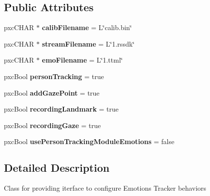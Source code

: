 \subsection*{Public Attributes}
\begin{DoxyCompactItemize}
\item 
\mbox{\label{class_emotions_configuration_abd2c50caf6290933d5044e49b218f207}} 
pxc\+C\+H\+AR $\ast$ {\bfseries calib\+Filename} = L\char`\"{}calib.\+bin\char`\"{}
\item 
\mbox{\label{class_emotions_configuration_a2cdaff812ec953152f9648448859f44e}} 
pxc\+C\+H\+AR $\ast$ {\bfseries stream\+Filename} = L\char`\"{}1.rssdk\char`\"{}
\item 
\mbox{\label{class_emotions_configuration_a0acd66cdfc61dde2654762c5b43f9c89}} 
pxc\+C\+H\+AR $\ast$ {\bfseries emo\+Filename} = L\char`\"{}1.ttml\char`\"{}
\item 
\mbox{\label{class_emotions_configuration_ab1df9d7d072e50194dc3d85b38c6d6cb}} 
pxc\+Bool {\bfseries person\+Tracking} = true
\item 
\mbox{\label{class_emotions_configuration_a5e1ccf5105dd5bfed0fc021c4c8a32d4}} 
pxc\+Bool {\bfseries add\+Gaze\+Point} = true
\item 
\mbox{\label{class_emotions_configuration_a88d1643658f047c84d85f1a786762a3f}} 
pxc\+Bool {\bfseries recording\+Landmark} = true
\item 
\mbox{\label{class_emotions_configuration_a127e56275ce6a1326e85a35ac981a211}} 
pxc\+Bool {\bfseries recording\+Gaze} = true
\item 
\mbox{\label{class_emotions_configuration_a59bf0871027ddc0702774b9d3e24ec7b}} 
pxc\+Bool {\bfseries use\+Person\+Tracking\+Module\+Emotions} = false
\end{DoxyCompactItemize}


\subsection{Detailed Description}
Class for providing iterface to configure Emotions Tracker behaviors 

